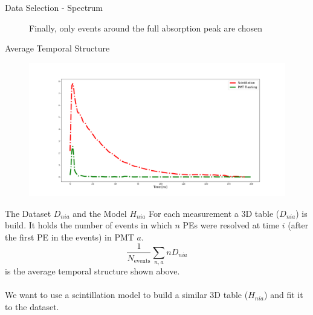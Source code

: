 \documentclass{beamer}
\begin{document}
\begin{frame}{Data Selection - Spectrum}
\begin{figure}
Finally, only events around the full absorption peak are chosen
\qquad
\end{figure}
\end{frame}

\begin{frame}{Average Temporal Structure}
\begin{figure}[h]
    \centering
    \includegraphics[width=1\textwidth]{temp.png}
\end{figure}
\end{frame}

\begin{frame}{The Dataset $D_{nia}$ and the Model $H_{nia}$}
For each measurement a 3D table ($D_{nia}$) is build. It holds the number of events in which $n$ PEs were resolved at time $i$ (after the first PE in the events) in PMT $a$.\\

\begin{equation}
\frac{1}{N_{\text{events}}}\sum_{n,a}nD_{nia}
\end{equation}
is the average temporal structure shown above.\\
\quad\\
We want to use a scintillation model to build a similar 3D table ($H_{nia}$) and fit it to the dataset.
\end{frame}
\end{document}

